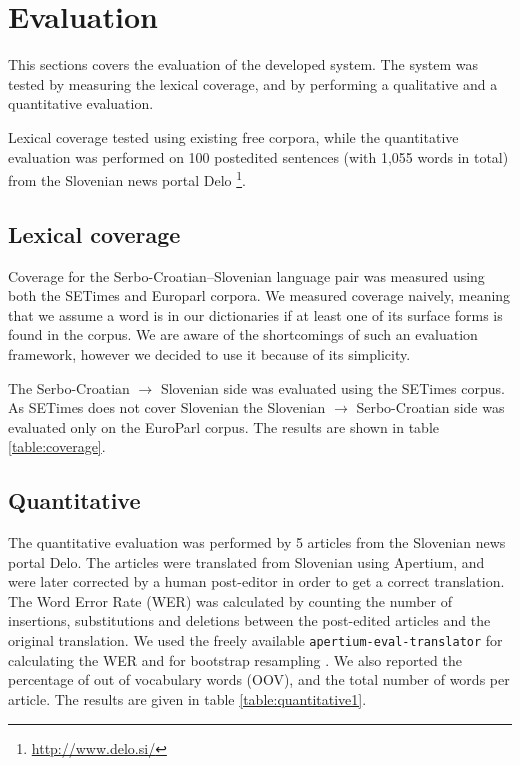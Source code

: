 \section{Evaluation}

This sections covers the evaluation of the developed system. 
The system was tested by measuring the lexical coverage, and by performing
a qualitative and a quantitative evaluation. 

Lexical coverage tested using existing free corpora, 
while the quantitative evaluation was performed on 100 postedited sentences (with 1,055 words in
total) from the Slovenian news portal 
Delo \footnote{\url{http://www.delo.si/}}.


\subsection{Lexical coverage}

Coverage for the Serbo-Croatian--Slovenian language pair was measured using both the SETimes \citep{tyers2010south} and Europarl \citep{koehn05a} corpora. 
We measured coverage naively, meaning that we assume a word is in our 
dictionaries if at least one of its surface forms is found in the corpus. 
We are aware of the shortcomings of such an evaluation framework, 
however we decided to use it because of its simplicity.

The Serbo-Croatian $\rightarrow$ Slovenian side was evaluated using the SETimes corpus.
As SETimes does not cover Slovenian
the Slovenian $\rightarrow$ Serbo-Croatian side was evaluated only on the EuroParl corpus. The results are shown in table \ref{table:coverage}.

\subsection{Quantitative}

The quantitative evaluation was performed by 5 articles
from the Slovenian news portal Delo.
The articles were translated from Slovenian using Apertium, and were later corrected by a human post-editor in order to get a correct translation.
The Word Error Rate (WER) was calculated
by counting the number of insertions, substitutions and deletions between the post-edited articles
and the original translation. We used the freely available \texttt{apertium-eval-translator} for calculating the WER 
and for bootstrap resampling \cite{koehn04}.
We also reported the percentage of out of vocabulary words (OOV), and the total number of words per article.
The results are given in table \ref{table:quantitative1}.

